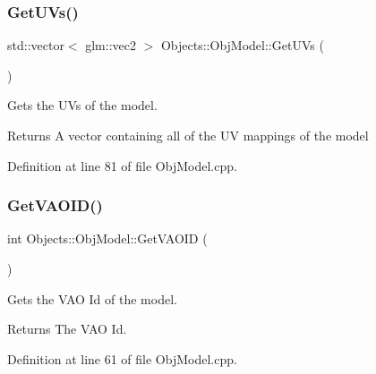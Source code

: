\mbox{\label{class_objects_1_1_obj_model_a609d85c35d37c8495c91f43ab7047c68}} 
\subsubsection{\texorpdfstring{Get\+U\+Vs()}{GetUVs()}}
{\footnotesize\ttfamily std\+::vector$<$ glm\+::vec2 $>$ Objects\+::\+Obj\+Model\+::\+Get\+U\+Vs (\begin{DoxyParamCaption}{ }\end{DoxyParamCaption})}

Gets the U\+Vs of the model. \begin{DoxyReturn}{Returns}
A vector containing all of the UV mappings of the model 
\end{DoxyReturn}


Definition at line 81 of file Obj\+Model.\+cpp.

\mbox{\label{class_objects_1_1_obj_model_a197b62526db5e58e16e455bd6faf5da0}} 
\subsubsection{\texorpdfstring{Get\+V\+A\+O\+I\+D()}{GetVAOID()}}
{\footnotesize\ttfamily int Objects\+::\+Obj\+Model\+::\+Get\+V\+A\+O\+ID (\begin{DoxyParamCaption}{ }\end{DoxyParamCaption})}

Gets the V\+AO Id of the model. \begin{DoxyReturn}{Returns}
The V\+AO Id. 
\end{DoxyReturn}


Definition at line 61 of file Obj\+Model.\+cpp.

\mbox{\label{class_objects_1_1_obj_model_a816f3249aa96a8ac4ec39fcfb89e68e5}} 
